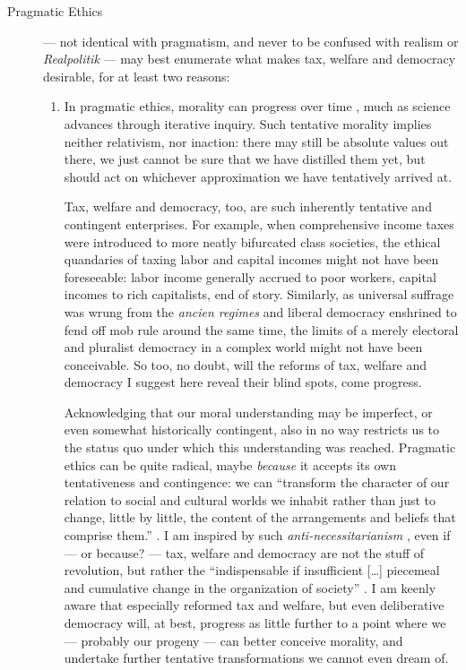 \begin{description}
	\item[Pragmatic Ethics \label{itm:pragmatic-ethics}] 
	--- not identical with pragmatism, and never to be confused with realism or \emph{Realpolitik} --- may best enumerate what makes tax, welfare and democracy desirable, for at least two reasons:
	\begin{enumerate}
		\item 
		In pragmatic ethics, morality can progress over time \citep{Dewey1932}, much as science advances through iterative inquiry. 
		Such tentative morality implies neither relativism, nor inaction: there may still be absolute values out there, we just cannot be sure that we have distilled them yet, but should act on whichever approximation we have tentatively arrived at.
		
		Tax, welfare and democracy, too, are such inherently tentative and contingent enterprises. 
		For example, when comprehensive income taxes were introduced to more neatly bifurcated class societies, the ethical quandaries of taxing labor and capital incomes might not have been foreseeable: labor income generally accrued to poor workers, capital incomes to rich capitalists, end of story. %
		Similarly, as universal suffrage was wrung from the \emph{ancien regimes} and liberal democracy enshrined to fend off mob rule around the same time, the limits of a merely electoral and pluralist democracy in a complex world might not have been conceivable. 
		So too, no doubt, will the reforms of tax, welfare and democracy I suggest here reveal their blind spots, come progress.
		
		Acknowledging that our moral understanding may be imperfect, or even somewhat historically contingent, also in no way restricts us to the status quo under which this understanding was reached. Pragmatic ethics can be quite radical, maybe \emph{because} it accepts its own tentativeness and contingence: we can ``transform the character of our relation to social and cultural worlds we inhabit rather than just to change, little by little, the content of the arrangements and beliefs that comprise them.'' \citep[6-7]{Unger2007}. 
		I am inspired by such \emph{anti-necessitarianism} \citep{Unger1987}, even if --- or because? --- tax, welfare and democracy are not the stuff of revolution, but rather the ``indispensable if insufficient [\ldots] piecemeal and cumulative change in the organization of society'' \citep[xix]{Unger1987}. 
		I am keenly aware that especially reformed tax and welfare, but even deliberative democracy will, at best, progress as little further to a point where we --- probably our progeny --- can better conceive morality, and undertake further tentative transformations we cannot even dream of.
		

\end{enumerate}
\end{description}
